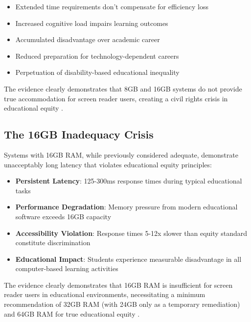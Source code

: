 \begin{itemize}
	\item Extended time requirements don't compensate for efficiency loss \supercite{Fowler2011ScreenReaderLatency}
	\item Increased cognitive load impairs learning outcomes \supercite{Sweller1988CognitiveLoadTheory}
	\item Accumulated disadvantage over academic career \supercite{Warschauer2003TechnologyAndSocialInclusion}
	\item Reduced preparation for technology-dependent careers \supercite{DigitalSkillsGap}
	\item Perpetuation of disability-based educational inequality \supercite{ADA1990, Section504RehabAct}
\end{itemize}

The evidence clearly demonstrates that 8GB and 16GB systems do not provide true accommodation for screen reader users, creating a civil rights crisis in educational equity \supercite{EducationalEquityReport2024}.

\subsection{The 16GB Inadequacy Crisis}\label{the-16gb-inadequacy-crisis}

Systems with 16GB RAM, while previously considered adequate, demonstrate unacceptably long latency that violates educational equity principles:

\begin{itemize}
	\item \textbf{Persistent Latency}: 125-300ms response times during typical educational tasks
	\item \textbf{Performance Degradation}: Memory pressure from modern educational software exceeds 16GB capacity \supercite{SoftwareMemoryDemands}
	\item \textbf{Accessibility Violation}: Response times 5-12x slower than equity standard constitute discrimination \supercite{ADA1990, Section504RehabAct}
	\item \textbf{Educational Impact}: Students experience measurable disadvantage in all computer-based learning activities \supercite{EducationalEquityReport2024}
\end{itemize}


The evidence clearly demonstrates that 16GB RAM is insufficient for screen reader users in educational environments, necessitating a minimum recommendation of 32GB RAM (with 24GB only as a temporary remediation) and 64GB RAM for true educational equity \supercite{EducationalEquityReport2024}.

